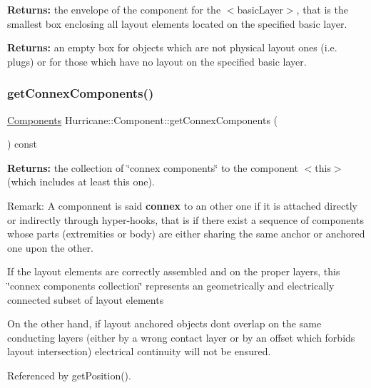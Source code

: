 {\bfseries Returns\+:} the envelope of the component for the {\ttfamily $<$basic\+Layer$>$}, that is the smallest box enclosing all layout elements located on the specified basic layer.

{\bfseries Returns\+:} an empty box for objects which are not physical layout ones (i.\+e. plugs) or for those which have no layout on the specified basic layer. \mbox{\label{classHurricane_1_1Component_a4acf996c03b0b94a186fad653ba578a6}} 
\subsubsection{\texorpdfstring{get\+Connex\+Components()}{getConnexComponents()}}
{\footnotesize\ttfamily \hyperlink{namespaceHurricane_a7d26d99aeb5dd6d70d51bd35d2473e72}{Components} Hurricane\+::\+Component\+::get\+Connex\+Components (\begin{DoxyParamCaption}{ }\end{DoxyParamCaption}) const}

{\bfseries Returns\+:} the collection of \char`\"{}connex components\char`\"{} to the component {\ttfamily $<$this$>$} (which includes at least this one).

\begin{DoxyParagraph}{Remark\+:}
A componnent is said {\bfseries connex} to an other one if it is attached directly or indirectly through hyper-\/hooks, that is if there exist a sequence of components whose parts (extremities or body) are either sharing the same anchor or anchored one upon the other.
\end{DoxyParagraph}
If the layout elements are correctly assembled and on the proper layers, this \char`\"{}connex components collection\char`\"{} represents an geometrically and electrically connected subset of layout elements

On the other hand, if layout anchored objects don\textquotesingle{}t overlap on the same conducting layers (either by a wrong contact layer or by an offset which forbids layout intersection) electrical continuity will not be ensured. 

Referenced by get\+Position().

\mbox{\label{classHurricane_1_1Component_af6d6b7c6b3cb18754cfa02bc5fb1e754}} 
